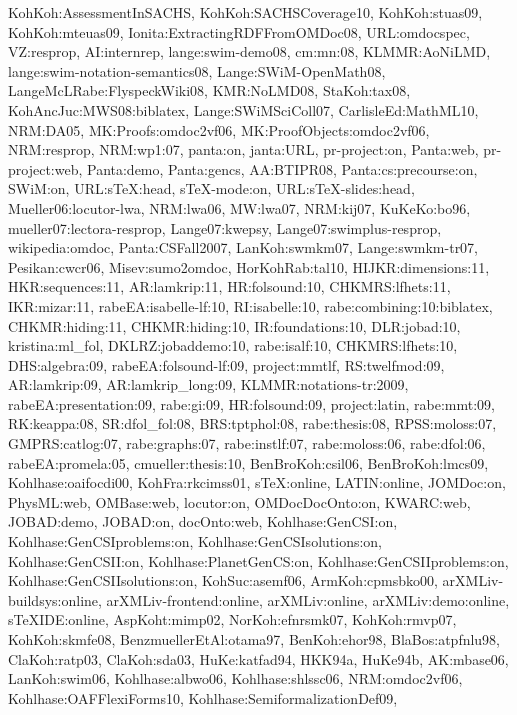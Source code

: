 {KohKoh:AssessmentInSACHS,%
KohKoh:SACHSCoverage10,%
KohKoh:stuas09,%
KohKoh:mteuas09,%
Ionita:ExtractingRDFFromOMDoc08,%
URL:omdocspec,%
VZ:resprop,%
AI:internrep,%
lange:swim-demo08,%
cm:mn:08,%
KLMMR:AoNiLMD,%
lange:swim-notation-semantics08,%
Lange:SWiM-OpenMath08,%
LangeMcLRabe:FlyspeckWiki08,%
KMR:NoLMD08,%
StaKoh:tax08,%
KohAncJuc:MWS08:biblatex,%
Lange:SWiMSciColl07,%
CarlisleEd:MathML10,%
NRM:DA05,%
MK:Proofs:omdoc2vf06,%
MK:ProofObjects:omdoc2vf06,%
NRM:resprop,%
NRM:wp1:07,%
panta:on,%
janta:URL,%
pr-project:on,%
Panta:web,%
pr-project:web,%
Panta:demo,%
Panta:gencs,%
AA:BTIPR08,%
Panta:cs:precourse:on,%
SWiM:on,%
URL:sTeX:head,%
sTeX-mode:on,%
URL:sTeX-slides:head,%
Mueller06:locutor-lwa,%
NRM:lwa06,%
MW:lwa07,%
NRM:kij07,%
KuKeKo:bo96,%
mueller07:lectora-resprop,%
Lange07:kwepsy,%
Lange07:swimplus-resprop,%
wikipedia:omdoc,%
Panta:CSFall2007,%
LanKoh:swmkm07,%
Lange:swmkm-tr07,%
Pesikan:cwcr06,%
Misev:sumo2omdoc,%
HorKohRab:tal10,%
HIJKR:dimensions:11,%
HKR:sequences:11,%
AR:lamkrip:11,%
HR:folsound:10,%
CHKMRS:lfhets:11,%
IKR:mizar:11,%
rabeEA:isabelle-lf:10,%
RI:isabelle:10,%
rabe:combining:10:biblatex,%
CHKMR:hiding:11,%
CHKMR:hiding:10,%
IR:foundations:10,%
DLR:jobad:10,%
kristina:ml_fol,%
DKLRZ:jobaddemo:10,%
rabe:isalf:10,%
CHKMRS:lfhets:10,%
DHS:algebra:09,%
rabeEA:folsound-lf:09,%
project:mmtlf,%
RS:twelfmod:09,%
AR:lamkrip:09,%
AR:lamkrip_long:09,%
KLMMR:notations-tr:2009,%
rabeEA:presentation:09,%
rabe:gi:09,%
HR:folsound:09,%
project:latin,%
rabe:mmt:09,%
RK:keappa:08,%
SR:dfol_fol:08,%
BRS:tptphol:08,%
rabe:thesis:08,%
RPSS:moloss:07,%
GMPRS:catlog:07,%
rabe:graphs:07,%
rabe:instlf:07,%
rabe:moloss:06,%
rabe:dfol:06,%
rabeEA:promela:05,%
cmueller:thesis:10,%
BenBroKoh:csil06,%
BenBroKoh:lmcs09,%
Kohlhase:oaifocdi00,%
KohFra:rkcimss01,%
sTeX:online,%
LATIN:online,%
JOMDoc:on,%
PhysML:web,%
OMBase:web,%
locutor:on,%
OMDocDocOnto:on,%
KWARC:web,%
JOBAD:demo,%
JOBAD:on,%
docOnto:web,%
Kohlhase:GenCSI:on,%
Kohlhase:GenCSIproblems:on,%
Kohlhase:GenCSIsolutions:on,%
Kohlhase:GenCSII:on,%
Kohlhase:PlanetGenCS:on,%
Kohlhase:GenCSIIproblems:on,%
Kohlhase:GenCSIIsolutions:on,%
KohSuc:asemf06,%
ArmKoh:cpmsbko00,%
arXMLiv-buildsys:online,%
arXMLiv-frontend:online,%
arXMLiv:online,%
arXMLiv:demo:online,%
sTeXIDE:online,%
AspKoht:mimp02,%
NorKoh:efnrsmk07,%
KohKoh:rmvp07,%
KohKoh:skmfe08,%
BenzmuellerEtAl:otama97,%
BenKoh:ehor98,%
BlaBos:atpfnlu98,%
ClaKoh:ratp03,%
ClaKoh:sda03,%
HuKe:katfad94,%
HKK94a,%
HuKe94b,%
AK:mbase06,%
LanKoh:swim06,%
Kohlhase:albwo06,%
Kohlhase:shlssc06,%
NRM:omdoc2vf06,%
Kohlhase:OAFFlexiForms10,%
Kohlhase:SemiformalizationDef09,%
}
